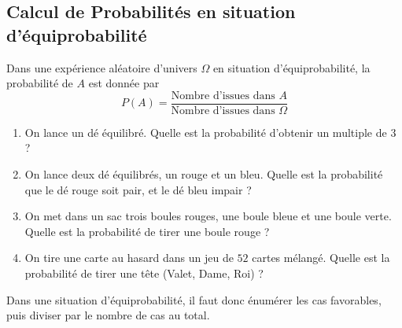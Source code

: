 \documentclass{article}
\begin{document}
\subsection{Calcul de Probabilités en situation d'équiprobabilité}
\begin{proposition}
Dans une expérience aléatoire d'univers $\Omega$ en situation d'équiprobabilité, la probabilité de $A$ est donnée par
\begin{equation*}
P(A)=\dfrac{\text{Nombre d'issues dans } A}{\text{Nombre d'issues dans }\Omega}
\end{equation*}
\end{proposition}
\begin{example}
\begin{enumerate}[label=\emph{\alph*)}]
\item On lance un dé équilibré. Quelle est la probabilité d'obtenir un multiple de $3$ ?
\item On lance deux dé équilibrés, un rouge et un bleu. Quelle est la probabilité que le dé rouge soit pair, et le dé bleu impair ?
\item On met dans un sac trois boules rouges, une boule bleue et une boule verte. Quelle est la probabilité de tirer une boule rouge ?
\item On tire une carte au hasard dans un jeu de $52$ cartes mélangé. Quelle est la probabilité de tirer une \og tête \fg (Valet, Dame, Roi) ?
\end{enumerate}
\end{example}
\emptybox{4cm}
\begin{tcolorbox}
Dans une situation d'équiprobabilité, il faut donc énumérer les cas favorables, puis diviser par le nombre de cas au total.
\end{tcolorbox}
\vspace*{1cm}
\end{document}
